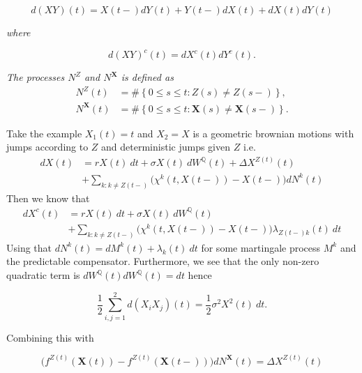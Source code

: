 \documentclass[a4paper,10pt,openany]{book}
\begin{document}
\[
d(XY)(t)=X(t-)dY(t)+Y(t-)dX(t)+dX(t)dY(t)
\]

\emph{where}

\[
d(XY)^c(t)=dX^c(t)dY^c(t).
\]

\emph{The processes \(N^Z\) and \(N^\mathbf X\) is defined as}
\begin{align*}
N^Z(t)&=\#\left\{ 0\le s\le t: Z(s)\ne Z(s-) \right\},\\
N^\mathbf X(t)&=\#\left\{ 0\le s\le t: \mathbf X(s)\ne \mathbf X(s-) \right\}.
\end{align*}

Take the example \(X_1(t)=t\) and \(X_2=X\) is a geometric brownian motions with jumps according to \(Z\) and deterministic jumps given \(Z\) i.e.
\begin{align*}
dX(t)&=rX(t)\ dt+\sigma X(t)\ dW^\mathbb Q(t)+\Delta X^{Z(t)}(t)\\
&+\sum_{k:k\ne Z(t-)}\Big(\chi^k(t,X(t-))-X(t-)\Big)dN^{k}(t)
\end{align*}
Then we know that
\begin{align*}
dX^c(t)&=rX(t)\ dt+\sigma X(t)\ dW^\mathbb Q(t)\\
&+\sum_{k:k\ne Z(t-)}\Big(\chi^k(t,X(t-))-X(t-)\Big)\lambda_{Z(t-)k}(t)\ dt
\end{align*}
Using that \(dN^k(t)=dM^k(t)+\lambda_k(t)\ dt\) for some martingale process \(M^k\) and the predictable compensator. Furthermore, we see that the only non-zero quadratic term is \(dW^\mathbb Q(t)dW^\mathbb Q(t)=dt\) hence

\[
\frac{1}{2}\sum_{i,j=1}^2d(X_iX_j)(t)=\frac{1}{2}\sigma^2X^2(t)\ dt.
\]

Combining this with

\[
\Big(f^{Z(t)}(\mathbf X(t))-f^{Z(t)}(\mathbf X(t-))\Big)dN^\mathbf X(t)=\Delta X^{Z(t)}(t)
\]
\end{document}
